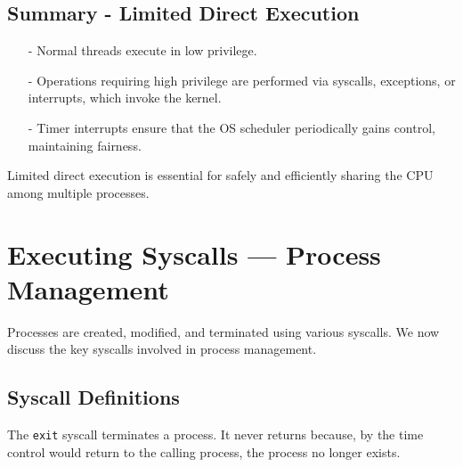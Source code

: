 \subsection*{Summary - Limited Direct Execution}
\begin{itemize}
  \item[-] Normal threads execute in low privilege.
  \item[-] Operations requiring high privilege are performed via syscalls, exceptions, or interrupts, which invoke the kernel.
  \item[-] Timer interrupts ensure that the OS scheduler periodically gains control, maintaining fairness.
\end{itemize}

Limited direct execution is essential for safely and efficiently sharing the CPU among multiple processes.

\section{Executing Syscalls --- Process Management}

Processes are created, modified, and terminated using various syscalls. We now discuss the key syscalls involved in process management.

\subsection{Syscall Definitions}

\begin{definition}
The \texttt{exit} syscall terminates a process. It never returns because, by the time control would return to the calling process, the process no longer exists.
\end{definition}

